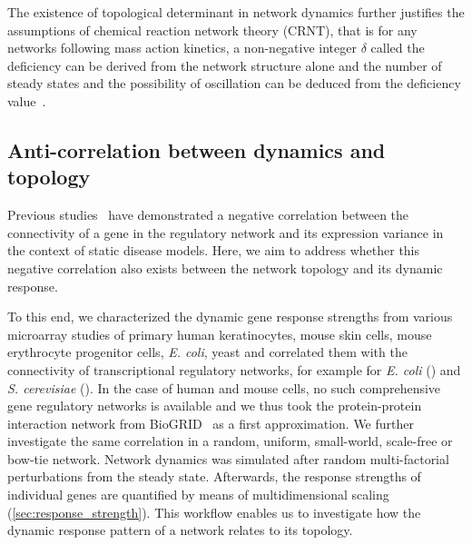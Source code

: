 The existence of topological determinant in network dynamics
further justifies the assumptions of chemical reaction network
theory (CRNT), that is for any networks following mass action kinetics,
a non-negative integer $\delta$ called the
deficiency can be derived from the network structure
alone and the number of steady states and the possibility of 
oscillation can be deduced from the deficiency value~\citep{Conradi2005}.

\subsection{Anti-correlation between dynamics and topology}
Previous studies~\citep{Lu2007a,Mar2011} have demonstrated a negative
correlation between the connectivity of a gene in the regulatory network
and its expression variance in the context of static disease models.
Here, we aim to address whether this negative correlation also exists 
between the network topology and its dynamic response.

To this end, we characterized the dynamic gene response strengths from 
various microarray studies of primary human keratinocytes, mouse skin
cells, mouse erythrocyte progenitor cells, \emph{E. coli}, yeast and
correlated them with the connectivity of
transcriptional regulatory networks, for example for \emph{E. coli} 
(\citealp{Gama-Castro2008}) 
and \emph{S. cerevisiae} (\citealp{Balaji2006}). In the case of human and
mouse cells, no such comprehensive gene regulatory networks is available
and we thus took the protein-protein interaction network from BioGRID~%
\citep{Stark2006} as a first approximation. 
We further investigate the same correlation in a random,
uniform, small-world, scale-free or bow-tie network. Network dynamics was simulated after 
random 
multi-factorial perturbations from the steady state. Afterwards, the response 
strengths of individual genes are quantified by means of multidimensional 
scaling (\ref{sec:response_strength}). 
This workflow enables us to investigate how the dynamic
response pattern of a network relates to its topology. 

